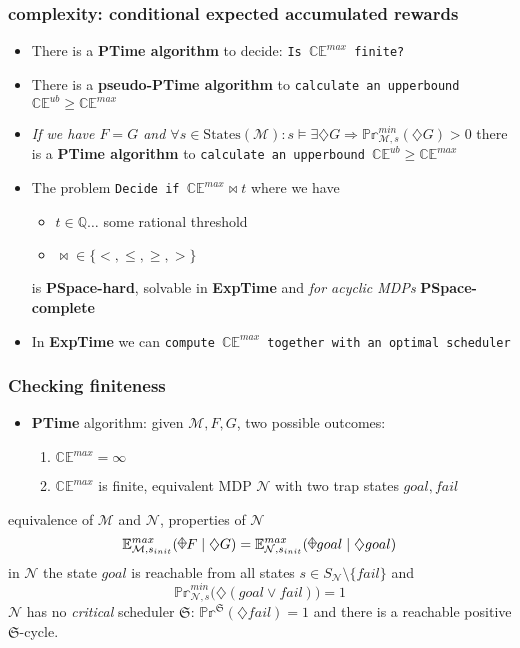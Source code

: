 \documentclass[onlymath]{beamer}
\begin{document}
\begin{frame}
\frametitle{complexity: conditional expected accumulated rewards}
\begin{itemize}
	\item There is a \textbf{PTime algorithm} to decide: \texttt{Is $\mathbb{CE}^{max}$ finite?} \pause
	\item There is a \textbf{pseudo-PTime algorithm} to \texttt{calculate an upperbound $\mathbb{CE}^{ub} \geq \mathbb{CE}^{max}$} \pause
	\item \textit{If we have $F=G$ and $\forall s \in \mathrm{States}(\mathcal{M}): s \vDash \exists \diamondsuit G \Rightarrow \mathbb{Pr}_{\mathcal{M},s}^{min}(\diamondsuit G) > 0$ } there is a \textbf{PTime algorithm} to \texttt{calculate an upperbound $\mathbb{CE}^{ub} \geq \mathbb{CE}^{max}$} \pause
	\item The problem \texttt{Decide if $\mathbb{CE}^{max} \bowtie t$} where we have
	\begin{itemize}
		\item $t\in \mathbb{Q}\dots$ some rational threshold \pause
		\item $\bowtie \in \{<,\leq,\geq,>\}$ \pause
	\end{itemize} is \textbf{PSpace-hard}, solvable in \textbf{ExpTime} and \textit{for acyclic MDPs} \textbf{PSpace-complete} \pause
	\item In \textbf{ExpTime} we can \texttt{compute $\mathbb{CE}^{max}$ together with an optimal scheduler}
\end{itemize}

\end{frame}

\begin{frame}
	\frametitle{Checking finiteness}
	\begin{itemize}
		\item \textbf{PTime} algorithm: given $\mathcal{M}, F, G$, two possible outcomes:
		\begin{enumerate}[(1)]
			\item $\mathbb{CE}^{max} = \infty$
			\item $\mathbb{CE}^{max}$ is finite, equivalent MDP $\mathcal{N}$ with two trap states $goal, fail$
		\end{enumerate}
	\end{itemize}
\pause
\begin{block}{equivalence of $\mathcal{M}$ and $\mathcal{N}$, properties of $\mathcal{N}$}
	\[
		\mathbb{E}_{\mathcal{M},s_{init}}^{max} (\rawdiaplus F \mid \diamondsuit G) = \mathbb{E}_{\mathcal{N},s_{init}}^{max} (\rawdiaplus goal \mid \diamondsuit goal)
	\]
	\pause
	in $\mathcal{N}$ the state $goal$ is reachable from all states $s \in S_\mathcal{N} \setminus \{fail\}$ and \[
		\mathbb{Pr}_{\mathcal{N},s}^{min}\Big(\diamondsuit(goal \lor fail)\Big) = 1
	\]
	\pause
	$\mathcal{N}$ has no \textit{critical} scheduler $\mathfrak{S}$: $\mathbb{Pr}^{\mathfrak{S}}(\diamondsuit fail) = 1$ and there is a reachable positive $\mathfrak{S}$-cycle.
\end{block}

\end{frame}
\end{document}
